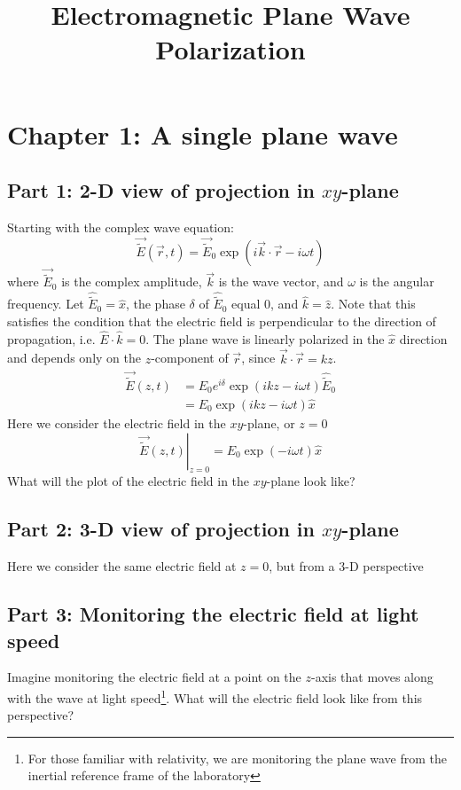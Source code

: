 \documentclass{article}
\title{Electromagnetic Plane Wave Polarization}
\author{}
\date{}
\begin{document}
\maketitle

\section{Chapter 1: A single plane wave}
\subsection{Part 1: 2-D view of projection in $xy$-plane}
Starting with the complex wave equation:
\begin{equation}
    \vec{\widetilde{E}}\left(\vec{r},t\right) = \vec{\widetilde{E}}_0 \exp \left(i \vec{k} \cdot \vec{r} - i \omega t\right)
\end{equation}
where $\vec{\widetilde{E}}_0$ is the complex amplitude, $\vec{k}$ is the wave vector, and $\omega$ is the angular frequency.  Let $\hat{\widetilde{E}}_0 = \hat{x}$,  the phase $\delta$ of $\hat{\widetilde{E}}_0$ equal $0$, and  $\hat{k} = \hat{z}$.  Note that this satisfies the condition that the electric field is perpendicular to the direction of propagation, i.e. $\hat{E} \cdot \hat{k} = 0$.  The plane wave is linearly polarized in the $\hat{x}$ direction and depends only on the $z$-component of $\vec r$, since $\vec{k} \cdot \vec{r} = kz$.
\begin{align}
     \vec{\widetilde{E}}\left(z,t\right) &= E_0 e^{i\delta} \exp \left(i kz - i \omega t\right) \hat{\widetilde{E}}_0\\
     &= E_0 \exp \left(i kz - i \omega t\right) \hat{x}
\end{align}
Here we consider the electric field in the $xy$-plane, or $z=0$
\begin{equation}
     \left.\vec{\widetilde{E}}\left(z,t\right)\right\rvert_{z=0} = E_0 \exp \left(- i \omega t\right) \hat{x}
\end{equation}
What will the plot of the electric field in the $xy$-plane look like?

\subsection{Part 2: 3-D view of projection in $xy$-plane}
Here we consider the same electric field at $z=0$, but from a 3-D perspective

\subsection{Part 3: Monitoring the electric field at light speed}
Imagine monitoring the electric field at a point on the $z$-axis that moves along with the wave at light speed\footnote{For those familiar with relativity, we are monitoring the plane wave from the inertial reference frame of the laboratory}.  What will the electric field look like from this perspective?
\end{document}
